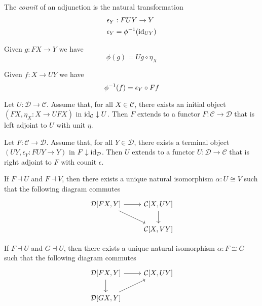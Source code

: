 \begin{df}[Counit]
The \emph{counit} of an adjunction is the natural transformation
\begin{align*}
\epsilon_Y & : FUY \rightarrow Y \\
\epsilon_Y & = {\phi}^{-1}(\mathrm{id}_{UY})
\end{align*}
\end{df}

\begin{prop}
Given $g : FX \rightarrow Y$ we have
\[ \phi(g) = Ug \circ \eta_X \]
\end{prop}

\begin{prop}
Given $f : X \rightarrow UY$ we have
\[ {\phi}^{-1}(f) = \epsilon_Y \circ Ff \]
\end{prop}

\begin{prop}
Let $U : \mathcal{D} \rightarrow \mathcal{C}$. Assume that, for all $X \in \mathcal{C}$, there exists an initial object $(FX,\eta_X : X \rightarrow UFX)$ in $\mathrm{id}_{\mathcal{C}} \downarrow U$. Then $F$ extends to a functor $F : \mathcal{C} \rightarrow \mathcal{D}$ that is left adjoint to $U$ with unit $\eta$.
\end{prop}

\begin{prop}
Let $F : \mathcal{C} \rightarrow \mathcal{D}$. Assume that, for all $Y \in \mathcal{D}$, there exists a terminal object $(UY, \epsilon_Y : FUY \rightarrow Y)$ in $F \downarrow \mathrm{id}_{\mathcal{D}}$. Then $U$ extends to a functor $U : \mathcal{D} \rightarrow \mathcal{C}$ that is right adjoint to $F$ with counit $\epsilon$.
\end{prop}

\begin{prop}
If $F \dashv U$ and $F \dashv V$, then there exists a unique natural isomorphism $\alpha : U \cong V$ such that the following diagram commutes
\[ \begin{tikzcd}
\mathcal{D}[FX,Y] \arrow[r] \arrow[dr] & \mathcal{C}[X,UY] \arrow[d] \\
& \mathcal{C}[X,VY] 
\end{tikzcd}
\]
\end{prop}

\begin{prop}
If $F \dashv U$ and $G \dashv U$, then there exists a unique natural isomorphism $\alpha : F \cong G$ such that the following diagram commutes
\[ \begin{tikzcd}
\mathcal{D}[FX,Y] \arrow[r] \arrow[d] & \mathcal{C}[X,UY] \\
\mathcal{D}[GX,Y] \arrow[ur]
\end{tikzcd}
\]
\end{prop}

